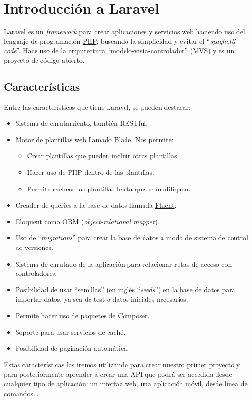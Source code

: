 \chapter{Introducción a Laravel}

\href{https://laravel.com/}{Laravel} es un \textit{framework} para crear aplicaciones y servicios web haciendo uso del lenguaje de programación \href{https://es.wikipedia.org/wiki/PHP}{PHP}, buscando la simplicidad y evitar el “\textit{spaghetti code}”. Hace uso de la arquitectura “modelo-vista-controlador” (MVS) y es un proyecto de código abierto.

\section{Características}
Entre las características que tiene Laravel, se pueden destacar:

\begin{itemize}
    \item Sistema de enrutamiento, también RESTful.
    \item Motor de plantillas web llamado \href{https://laravel.com/docs/10.x/blade}{Blade}. Nos permite:
    \begin{itemize}
        \item Crear plantillas que pueden incluir otras plantillas.
        \item Hacer uso de PHP dentro de las plantillas.
        \item Permite cachear las plantillas hasta que se modifiquen.
    \end{itemize}
    \item Creador de queries a la base de datos llamada \href{https://laravel.com/docs/10.x/queries}{Fluent}.
    \item \href{https://laravel.com/docs/10.x/eloquent}{Eloquent} como ORM (\textit{object-relational mapper}).
    \item Uso de “\textit{migrations}” para crear la base de datos a modo de sistema de control de versiones.
    \item Sistema de enrutado de la aplicación para relacionar rutas de acceso con controladores.
    \item Posibilidad de usar “semillas” (en inglés “\textit{seeds}”) en la base de datos para importar datos, ya sea de test o datos iniciales necesarios.
    \item Permite hacer uso de paquetes de \href{https://getcomposer.org/}{Composer}.
    \item Soporte para usar servicios de caché.
    \item Posibilidad de paginación automática.
\end{itemize}

Estas características las iremos utilizando para crear nuestro primer proyecto y para posteriormente aprender a crear una API que podrá ser accedida desde cualquier tipo de aplicación: un interfaz web, una aplicación móvil, desde línea de comandos...